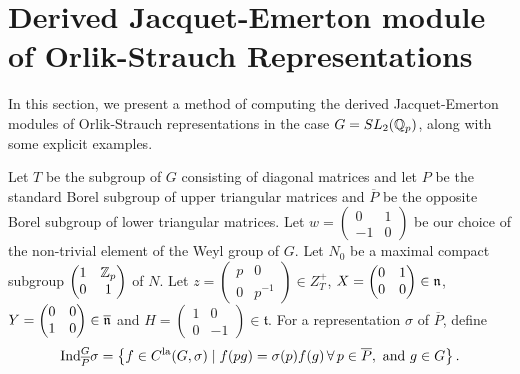 \documentclass[10pt]{amsart}
\begin{document}

\vspace{3mm}
\section{Derived Jacquet-Emerton module of Orlik-Strauch Representations}\label{sec:example}

In this section, we present a method of computing the derived Jacquet-Emerton modules of Orlik-Strauch representations in the case $G=SL_{2}(\mathbb{Q}_{p})$, along with some explicit examples. 

Let $T$ be the subgroup of $G$ consisting of diagonal matrices and let $P$ be the standard Borel subgroup of upper triangular matrices and $\overline{P}$ be the opposite Borel subgroup of lower triangular matrices. Let $w=\begin{pmatrix} 0 & 1 \\ -1 & 0 \end{pmatrix}$ be our choice of the non-trivial element of the Weyl group of $G$. Let $N_{0}$ be a maximal compact subgroup $\begin{pmatrix} 1 & \mathbb{Z}_{p} \\ 0 & 1 \end{pmatrix}$ of $N$. Let $z=\begin{pmatrix} p & 0 \\ 0 & p^{-1} \end{pmatrix}\in Z_{T}^{+}$, $X=\begin{pmatrix} 0 & 1 \\ 0 & 0 \end{pmatrix}\in \mathfrak{n}$, $Y=\begin{pmatrix} 0 & 0 \\ 1 & 0 \end{pmatrix}\in \overline{\mathfrak{n}}$ and $H=\begin{pmatrix} 1 & 0 \\ 0 & -1 \end{pmatrix}\in \mathfrak{t}$. For a representation $\sigma$ of $\overline{P}$, define \[
    \textnormal{Ind}_{\overline{P}}^{G}\sigma = \left\{ f\in C^{\textnormal{la}}(G,\sigma)\mid f(pg)=\sigma(p)f(g)\, \forall\, p\in \overline{P}, \textnormal{ and }g\in G\right\}.
\]
\end{document}
